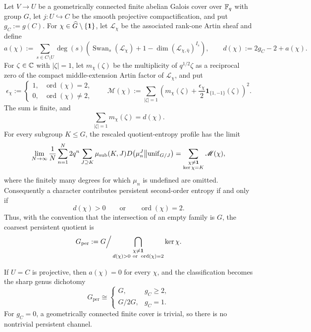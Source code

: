 \begin{theorem}
\label{thm:finite-field-persistent-conductor-classification}
Let \(V\to U\) be a geometrically connected finite \etale{} abelian Galois
cover over \(\mathbb{F}_q\) with group \(G\), let \(j:U\hookrightarrow C\) be the
smooth projective compactification, and put \(g_C:=g(C)\).  For
\(\chi\in\widehat G\setminus\{\mathbf{1}\}\), let \(\mathcal L_\chi\) be the
associated rank-one Artin sheaf and define
\[
 a(\chi):=\sum_{s\in C\setminus U}\deg(s)
 \left(\operatorname{Swan}_s(\mathcal L_\chi)
 +1-\dim (\mathcal L_{\chi,\bar\eta})^{I_s}\right),
 \qquad
 d(\chi):=2g_C-2+a(\chi).
\]
For \(\zeta\in\mathbb{C}\) with \(|\zeta|=1\), let \(m_\chi(\zeta)\) be the
multiplicity of \(q^{1/2}\zeta\) as a reciprocal zero of the compact
middle-extension Artin factor of \(\mathcal L_\chi\), and put
\[
 \epsilon_\chi:=
 \begin{cases}
 1,&\operatorname{ord}(\chi)=2,\\
 0,&\operatorname{ord}(\chi)\ne2,
 \end{cases}
 \qquad
 \mathscr M(\chi):=
 \sum_{|\zeta|=1}
 \left(
 m_\chi(\zeta)
 +\frac{\epsilon_\chi}{2}\mathbf 1_{\{1,-1\}}(\zeta)
 \right)^2.
\]
The sum is finite, and
\[
 \sum_{|\zeta|=1}m_\chi(\zeta)=d(\chi).
\]
For every subgroup \(K\le G\), the rescaled quotient-entropy profile has the
limit
\[
 \lim_{N\to\infty}\frac1N\sum_{n=1}^N
 2q^n\sum_{J\supseteq K}\mu_{\mathrm{sub}}(K,J)
 D\!\left(\mu_n^J\middle\|\mathrm{unif}_{G/J}\right)
 =
 \sum_{\substack{\chi\ne\mathbf{1}\\\ker\chi=K}}\mathscr M(\chi),
\]
where the finitely many degrees for which \(\mu_n\) is undefined are omitted.
Consequently a character contributes persistent second-order entropy if and
only if
\[
 d(\chi)>0\qquad\text{or}\qquad\operatorname{ord}(\chi)=2.
\]
Thus, with the convention that the intersection of an empty family is \(G\),
the coarsest persistent quotient is
\[
 G_{\mathrm{per}}
 :=G\Big/\bigcap_{\substack{\chi\ne\mathbf{1}\\
 d(\chi)>0\ \mathrm{or}\ \operatorname{ord}(\chi)=2}}
 \ker\chi.
\]

If \(U=C\) is projective, then \(a(\chi)=0\) for every \(\chi\), and the
classification becomes the sharp genus dichotomy
\[
 G_{\mathrm{per}}\cong
 \begin{cases}
 G,&g_C\ge2,\\
 G/2G,&g_C=1.
 \end{cases}
\]
For \(g_C=0\), a geometrically connected finite \etale{} cover is trivial, so
there is no nontrivial persistent channel.
\end{theorem}


